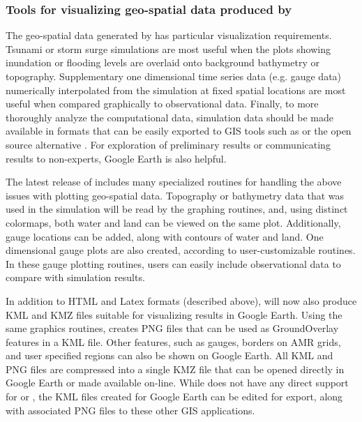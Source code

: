 \subsubsection{Tools for visualizing geo-spatial data produced by \geoclaw}
The geo-spatial data generated by \geoclaw has particular visualization
requirements.  Tsunami or storm surge simulations are most useful when
the plots showing inundation or flooding levels are overlaid onto
background bathymetry or topography.  Supplementary one dimensional
time series data (e.g. gauge data) numerically interpolated from
the simulation at fixed spatial locations are most useful when
compared graphically to observational data.  Finally, to more
thoroughly analyze the computational data, simulation data
should be made available in formats that can be easily exported to GIS tools
such as \agis or the open source alternative \qgis
\cite{arcgis,qgis}.  For exploration of preliminary results or
communicating results to non-experts, Google
Earth is also helpful.

The latest release of \clawpack includes many specialized \visclaw routines
for handling the above issues with plotting geo-spatial data.
Topography or bathymetry data that was
used in the simulation will be read by the graphing routines, and,
using distinct colormaps, both water and land can be viewed on the
same plot.   Additionally, gauge locations can be added, along with contours
of water and land.  One dimensional gauge plots are also created, according to
user-customizable routines. In these gauge plotting routines,
users can easily include  observational data to compare with \geoclaw
simulation results.

In addition to HTML and Latex formats (described above), \visclaw will now also
produce KML and KMZ files suitable for visualizing results in Google Earth.
Using the same \mplotlib graphics routines, \visclaw creates PNG files
that can be used as GroundOverlay features in a KML file.  Other features, such
as gauges, borders on AMR grids, and user specified regions can also be
shown on Google Earth.  All KML and PNG files are compressed into a single
KMZ file  that can be opened directly in Google Earth or made available on-line.
While \visclaw does not have any direct support for \agis or \qgis,
the  KML files created for Google Earth can be edited for
export, along with associated PNG files to these other GIS applications.

